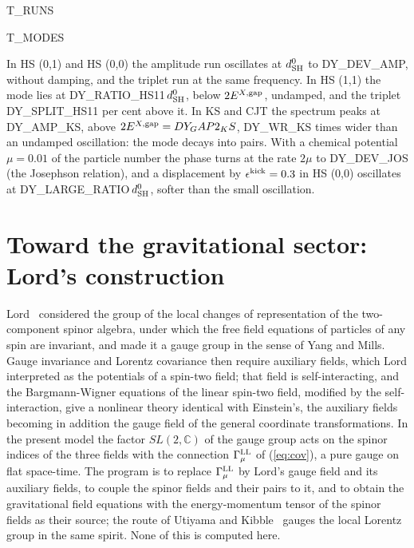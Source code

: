 \documentclass[aps,prd,onecolumn,superscriptaddress,nofootinbib,floatfix,longbibliography]{revtex4-2}
\newcommand{\LL}{{\rm LL}}
\newcommand{\SH}{{\rm SH}}
\begin{document}
{{T_RUNS}}

{{T_MODES}}

In HS (0,1) and HS (0,0) the amplitude run oscillates at $d^0_\SH$ to {{DY_DEV_AMP}}, without damping, and the triplet run
at the same frequency. In HS (1,1) the mode lies at {{DY_RATIO_HS11}}\,$d^0_\SH$, below $2E^{X,{\rm gap}}$, undamped, and the
triplet {{DY_SPLIT_HS11}} per cent above it. In KS and CJT the spectrum peaks at {{DY_AMP_KS}}, above $2E^{X,{\rm gap}}={{DY_GAP2_KS}}$,
{{DY_WR_KS}} times wider than an undamped oscillation: the mode decays into pairs. With a chemical potential $\mu=0.01$ of
the particle number the phase turns at the rate $2\mu$ to {{DY_DEV_JOS}} (the Josephson relation), and a displacement by
$\epsilon^{\rm kick}=0.3$ in HS (0,0) oscillates at {{DY_LARGE_RATIO}}\,$d^0_\SH$, softer than the small oscillation.

\section{Toward the gravitational sector: Lord's construction}
\label{sec:gravity}

Lord~\cite{Lord1971} considered the group of the local changes of representation of the two-component spinor algebra,
under which the free field equations of particles of any spin are invariant, and made it a gauge group in the sense of
Yang and Mills. Gauge invariance and Lorentz covariance then require auxiliary fields, which Lord interpreted as the
potentials of a spin-two field; that field is self-interacting, and the Bargmann-Wigner equations of the linear spin-two
field, modified by the self-interaction, give a nonlinear theory identical with Einstein's, the auxiliary fields becoming
in addition the gauge field of the general coordinate transformations. In the present model the factor $SL(2,\mathbb C)$
of the gauge group acts on the spinor indices of the three fields with the connection $\Gamma^\LL_\mu$ of (\ref{eq:cov}),
a pure gauge on flat space-time. The program is to replace $\Gamma^\LL_\mu$ by Lord's gauge field and its auxiliary fields,
to couple the spinor fields and their pairs to it, and to obtain the gravitational field equations with the
energy-momentum tensor of the spinor fields as their source; the route of Utiyama and Kibble~\cite{Utiyama1956,Kibble1961,Hehl1976}
gauges the local Lorentz group in the same spirit. None of this is computed here.
\end{document}

